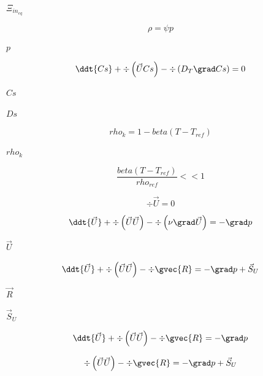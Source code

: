 \documentclass{article}
\begin{document}
$ \Xi_{{in}_{eq}} $
\pagebreak

\[
    \rho = \psi p
\]
\pagebreak

$        p     $
\pagebreak

\[
    \ddt{Cs} + \div \left(\vec{U} Cs\right) - \div \left(D_T \grad Cs \right)
    = 0
\]
\pagebreak

$        Cs      $
\pagebreak

$        Ds      $
\pagebreak

\[
    rho_{k} = 1 - beta(T - T_{ref})
\]
\pagebreak

$ rho_{k} $
\pagebreak

\[
    \frac{beta(T - T_{ref})}{rho_{ref}} << 1
\]
\pagebreak

\[
        \div \vec{U} = 0
    \]
\pagebreak

\[
        \ddt{\vec{U}}
      + \div \left( \vec{U} \vec{U} \right)
      - \div \left(\nu \grad \vec{U} \right)
      = - \grad p
    \]
\pagebreak

$        \vec{U} $
\pagebreak

\[
        \ddt{\vec{U}} + \div \left( \vec{U} \vec{U} \right) - \div \gvec{R}
      = - \grad p + \vec{S}_U
    \]
\pagebreak

$        \vec{R} $
\pagebreak

$        \vec{S}_U $
\pagebreak

\[
        \ddt{\vec{U}} + \div \left( \vec{U} \vec{U} \right) - \div \gvec{R}
      = - \grad p
    \]
\pagebreak

\[
        \div \left( \vec{U} \vec{U} \right) - \div \gvec{R}
      = - \grad p + \vec{S}_U
    \]
\pagebreak
\end{document}
